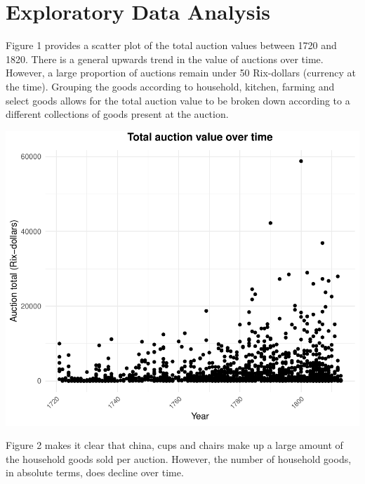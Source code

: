 \documentclass[11pt,preprint, authoryear]{elsarticle}
\numberwithin{equation}{section}
\numberwithin{figure}{section}
\numberwithin{table}{section}
\begin{document}
\hypertarget{exploratory-data-analysis}{%
\section{Exploratory Data Analysis}\label{exploratory-data-analysis}}

Figure 1 provides a scatter plot of the total auction values between
1720 and 1820. There is a general upwards trend in the value of auctions
over time. However, a large proportion of auctions remain under 50
Rix-dollars (currency at the time). Grouping the goods according to
household, kitchen, farming and select goods allows for the total
auction value to be broken down according to a different collections of
goods present at the auction.

\newpage

\begin{center}\includegraphics{Project_write_up_files/figure-latex/Figure1-1} \end{center}

Figure 2 makes it clear that china, cups and chairs make up a large
amount of the household goods sold per auction. However, the number of
household goods, in absolute terms, does decline over time.
\end{document}

